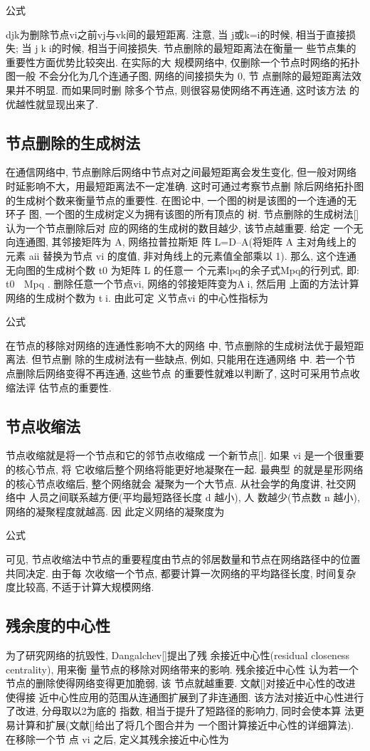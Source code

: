 			公式

			djk为删除节点vi之前vj与vk间的最短距离. 注意, 当 j或k=i的时候, 相当于直接损失; 当 jki的时候, 相当于间接损失. 节点删除的最短距离法在衡量一 些节点集的重要性方面优势比较突出. 在实际的大 规模网络中, 仅删除一个节点时网络的拓扑图一般 不会分化为几个连通子图, 网络的间接损失为 0, 节 点删除的最短距离法效果并不明显. 而如果同时删 除多个节点, 则很容易使网络不再连通, 这时该方法 的优越性就显现出来了.

\subsection{节点删除的生成树法}
在通信网络中, 节点删除后网络中节点对之间最短距离会发生变化, 但一般对网络时延影响不大，用最短距离法不一定准确. 这时可通过考察节点删 除后网络拓扑图的生成树个数来衡量节点的重要性. 在图论中, 一个图的树是该图的一个连通的无环子 图, 一个图的生成树定义为拥有该图的所有顶点的 树. 节点删除的生成树法[]认为一个节点删除后对 应的网络的生成树的数目越少, 该节点越重要. 给定 一个无向连通图, 其邻接矩阵为 A, 网络拉普拉斯矩 阵 L=D–A(将矩阵 A 主对角线上的元素 aii 替换为节点 vi 的度值, 非对角线上的元素值全部乘以1). 那么, 这个连通无向图的生成树个数 t0 为矩阵 L 的任意一 个元素lpq的余子式Mpq的行列式, 即: t0  Mpq . 删除任意一个节点vi, 网络的邻接矩阵变为Ai, 然后用 上面的方法计算网络的生成树个数为 ti. 由此可定 义节点vi 的中心性指标为

			公式

			在节点的移除对网络的连通性影响不大的网络 中, 节点删除的生成树法优于最短距离法. 但节点删 除的生成树法有一些缺点, 例如, 只能用在连通网络 中. 若一个节点删除后网络变得不再连通, 这些节点 的重要性就难以判断了, 这时可采用节点收缩法评 估节点的重要性.
\subsection{节点收缩法}
节点收缩就是将一个节点和它的邻节点收缩成 一个新节点[]. 如果 vi 是一个很重要的核心节点, 将 它收缩后整个网络将能更好地凝聚在一起. 最典型 的就是星形网络的核心节点收缩后, 整个网络就会 凝聚为一个大节点. 从社会学的角度讲, 社交网络中 人员之间联系越方便(平均最短路径长度 d 越小), 人 数越少(节点数 n 越小), 网络的凝聚程度就越高. 因 此定义网络的凝聚度为

			公式

			可见, 节点收缩法中节点的重要程度由节点的邻居数量和节点在网络路径中的位置共同决定. 由于每 次收缩一个节点, 都要计算一次网络的平均路径长度, 时间复杂度比较高, 不适于计算大规模网络.

\subsection{残余度的中心性}
为了研究网络的抗毁性, Dangalchev[]提出了残 余接近中心性(residual closeness centrality), 用来衡 量节点的移除对网络带来的影响. 残余接近中心性 认为若一个节点的删除使得网络变得更加脆弱, 该 节点就越重要. 文献[]对接近中心性的改进使得接 近中心性应用的范围从连通图扩展到了非连通图. 该方法对接近中心性进行了改进, 分母取以2为底的 指数, 相当于提升了短路径的影响力, 同时会使本算 法更易计算和扩展(文献[]给出了将几个图合并为 一个图计算接近中心性的详细算法). 在移除一个节 点 vi 之后, 定义其残余接近中心性为

